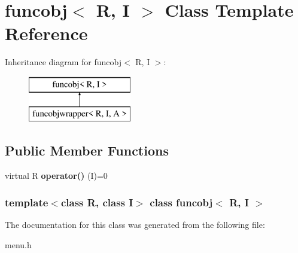 \hypertarget{classfuncobj}{\section{funcobj$<$ R, I $>$ Class Template Reference}
\label{classfuncobj}
}
Inheritance diagram for funcobj$<$ R, I $>$\-:\begin{figure}[H]
\begin{center}
\leavevmode
\includegraphics[height=2.000000cm]{classfuncobj}
\end{center}
\end{figure}
\subsection*{Public Member Functions}
\begin{DoxyCompactItemize}
\item 
\hypertarget{classfuncobj_ad8311f20bd0ddd211fec6e97847eccf3}{virtual R {\bfseries operator()} (I)=0}\label{classfuncobj_ad8311f20bd0ddd211fec6e97847eccf3}

\end{DoxyCompactItemize}
\subsubsection*{template$<$class R, class I$>$ class funcobj$<$ R, I $>$}



The documentation for this class was generated from the following file\-:\begin{DoxyCompactItemize}
\item 
menu.\-h\end{DoxyCompactItemize}

